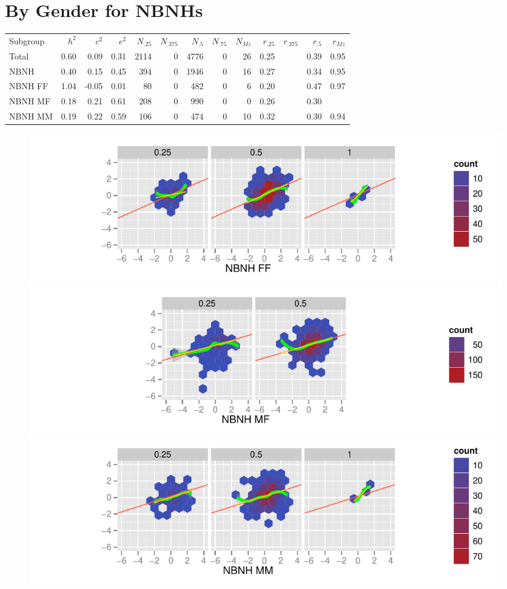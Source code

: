 \documentclass[a4paper]{article}
\begin{document}
\newpage
\section{By Gender for NBNHs}
\begin{table}[ht]
\begin{center}
\begin{tabular}{l|rrr|rrrrr|rrrr}
 Subgroup & $h^2$ & $c^2$ & $e^2$ & $N_{.25}$ & $N_{.375}$ & $N_{.5}$ & $N_{.75}$ & $N_{Mz}$ & $r_{.25}$ & $r_{.375}$ & $r_{.5}$ & $r_{Mz}$ \\ 
 Total & 0.60 & 0.09 & 0.31 & 2114 &   0 & 4776 &   0 &  26 & 0.25 &  & 0.39 & 0.95 \\ 
   \hline
NBNH & 0.40 & 0.15 & 0.45 & 394 &   0 & 1946 &   0 &  16 & 0.27 &  & 0.34 & 0.95 \\ 
  NBNH FF & 1.04 & -0.05 & 0.01 &  80 &   0 & 482 &   0 &   6 & 0.20 &  & 0.47 & 0.97 \\ 
  NBNH MF & 0.18 & 0.21 & 0.61 & 208 &   0 & 990 &   0 &   0 & 0.26 &  & 0.30 &  \\ 
  NBNH MM & 0.19 & 0.22 & 0.59 & 106 &   0 & 474 &   0 &  10 & 0.32 &  & 0.30 & 0.94 \\ 
  \end{tabular}
\end{center}
\end{table}\begin{figure}[htbp]
\includegraphics{Height-022}
\includegraphics{Height-023}
\includegraphics{Height-024}
\end{figure}
\end{document}
